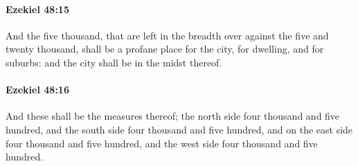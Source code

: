		\paragraph{Ezekiel 48:15} %
			\label{EZEKIEL-48-15}

			And the five thousand, that are left in the breadth over against the five and twenty thousand, shall be a profane place for the city, for dwelling, and for suburbs: and the city shall be in the midst thereof.


		\paragraph{Ezekiel 48:16} %
			\label{EZEKIEL-48-16}

			And these shall be the measures thereof; the north side four thousand and five hundred, and the south side four thousand and five hundred, and on the east side four thousand and five hundred, and the west side four thousand and five hundred.

